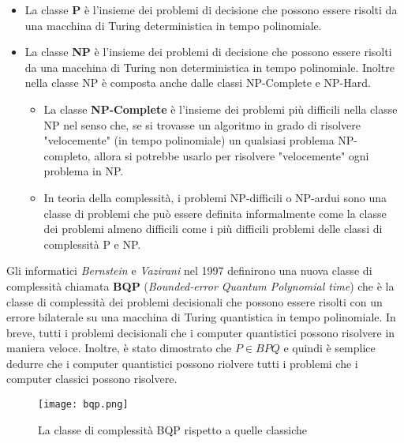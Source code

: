 \begin{itemize}
  \item La classe \textbf{P} è l'insieme dei problemi di decisione che possono essere risolti da una macchina di Turing deterministica in tempo polinomiale.
  \item La classe \textbf{NP} è l'insieme dei problemi di decisione che possono essere risolti da una macchina di Turing non deterministica in tempo polinomiale. Inoltre nella classe NP è composta anche dalle classi NP-Complete e NP-Hard.
  \begin{itemize}
    \item La classe \textbf{NP-Complete} è l'insieme dei problemi più difficili nella classe NP nel senso che, se si trovasse un algoritmo in grado di risolvere "velocemente" (in tempo polinomiale) un qualsiasi problema NP-completo, allora si potrebbe usarlo per risolvere "velocemente" ogni problema in NP.
    \item In teoria della complessità, i problemi NP-difficili o NP-ardui sono una classe di problemi che può essere definita informalmente come la classe dei problemi almeno difficili come i più difficili problemi delle classi di complessità P e NP.
  \end{itemize}
\end{itemize}

Gli informatici \textit{Bernstein} e \textit{Vazirani} nel 1997 definirono una nuova classe di complessità chiamata \textbf{BQP} \cite{bernstein1997quantum} (\textit{Bounded-error Quantum Polynomial time}) che è la classe di complessità dei problemi decisionali che possono essere risolti con un errore bilaterale su una macchina di Turing quantistica in tempo polinomiale. In breve, tutti i problemi decisionali che i computer quantistici possono risolvere in maniera veloce. Inoltre, è stato dimostrato che \( P \in BPQ \) e quindi è semplice dedurre che i computer quantistici possono riolvere tutti i problemi che i computer classici possono risolvere.

\begin{figure}[htbp]
  \centering
  \texttt{[image: bqp.png]}
  \caption{La classe di complessità BQP rispetto a quelle classiche}
  \label{fig:bqp}
\end{figure}


